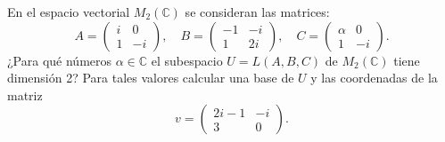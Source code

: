 \begin{ejercicio} En el espacio vectorial \( M_2(\mathbb{C}) \) se consideran las matrices:
	\[
		A = \begin{pmatrix} i & 0 \\ 1 & -i \end{pmatrix}, \quad
		B = \begin{pmatrix} -1 & -i \\ 1 & 2i \end{pmatrix}, \quad
		C = \begin{pmatrix} \alpha & 0 \\ 1 & -i \end{pmatrix}.
	\]
	¿Para qué números \( \alpha \in \mathbb{C} \) el subespacio \( U = L(A, B, C) \) de \( M_2(\mathbb{C}) \) tiene dimensión 2? Para tales valores calcular una base de \( U \) y las coordenadas de la matriz
	\[
		v = \begin{pmatrix} 2i - 1 & -i \\ 3 & 0 \end{pmatrix}.
	\]
\end{ejercicio}

